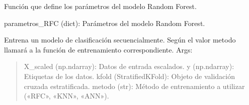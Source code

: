 \documentclass[letterpaper,10pt,spanish]{sphinxmanual}
\begin{document}
\begin{fulllineitems}
\label{\detokenize{Reduccion_Dimension:entrenar_modelos.param_RFC}}
\pysigstartsignatures
\pysiglinewithargsret
{}
{}
{}
\pysigstopsignatures
\sphinxAtStartPar
Función que define los parámetros del modelo Random Forest.
\begin{description}
\sphinxAtStartPar
parametros\_RFC (dict): Parámetros del modelo Random Forest.

\end{description}

\end{fulllineitems}

\label{\detokenize{Reduccion_Dimension:module-Seleccion_ejecucion}}

\begin{fulllineitems}
\label{\detokenize{Reduccion_Dimension:Seleccion_ejecucion.multihilo}}
\pysigstartsignatures
\pysiglinewithargsret
{}
{\sphinxparamcomma {}\sphinxparamcomma {}\sphinxparamcomma {}}
{}
\pysigstopsignatures
\sphinxAtStartPar
Entrena un modelo de clasificación secuencialmente.
Según el valor metodo llamará a la función de entrenamiento correspondiente.
Args:
\begin{quote}

\sphinxAtStartPar
X\_scaled (np.ndarray): Datos de entrada escalados.
y (np.ndarray): Etiquetas de los datos.
kfold (StratifiedKFold): Objeto de validación cruzada estratificada.
metodo (str): Método de entrenamiento a utilizar («RFC», «KNN», «ANN»).
\end{quote}

\end{fulllineitems}

\end{document}
